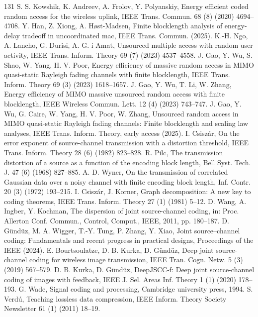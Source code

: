 \begin{thebibliography}{131}
 S. S. Kowshik, K. Andreev, A. Frolov, Y. Polyanskiy, Energy efficient coded random access for the wireless uplink, IEEE Trans. Commun. 68 (8) (2020) 4694--4708.
 Y. Han, Z. Xiong, A. Høst-Madsen, Finite blocklength analysis of energy-delay tradeoff in uncoordinated mac, IEEE Trans. Commun. (2025).
 K.-H. Ngo, A. Lancho, G. Durisi, A. G. i Amat, Unsourced multiple access with random user activity, IEEE Trans. Inform. Theory 69 (7) (2023) 4537--4558.
 J. Gao, Y. Wu, S. Shao, W. Yang, H. V. Poor, Energy efficiency of massive random access in MIMO quasi-static Rayleigh fading channels with finite blocklength, IEEE Trans. Inform. Theory 69 (3) (2023) 1618--1657.
 J. Gao, Y. Wu, T. Li, W. Zhang, Energy efficiency of MIMO massive unsourced random access with finite blocklength, IEEE Wireless Commun. Lett. 12 (4) (2023) 743--747.
 J. Gao, Y. Wu, G. Caire, W. Yang, H. V. Poor, W. Zhang, Unsourced random access in MIMO quasi-static Rayleigh fading channels: Finite blocklength and scaling law analyses, IEEE Trans. Inform. Theory, early access (2025).
 I. Csiszár, On the error exponent of source-channel transmission with a distortion threshold, IEEE Trans. Inform. Theory 28 (6) (1982) 823--828.
 R. Pilc, The transmission distortion of a source as a function of the encoding block length, Bell Syst. Tech. J. 47 (6) (1968) 827--885.
 A. D. Wyner, On the transmission of correlated Gaussian data over a noisy channel with finite encoding block length, Inf. Contr. 20 (3) (1972) 193--215.
 I. Csiszár, J. Korner, Graph decomposition: A new key to coding theorems, IEEE Trans. Inform. Theory 27 (1) (1981) 5--12.
 D. Wang, A. Ingber, Y. Kochman, The dispersion of joint source-channel coding, in: Proc. Allerton Conf. Commun., Control, Comput., IEEE, 2011, pp. 180--187.
 D. Gündüz, M. A. Wigger, T.-Y. Tung, P. Zhang, Y. Xiao, Joint source--channel coding: Fundamentals and recent progress in practical designs, Proceedings of the IEEE (2024).
 E. Bourtsoulatze, D. B. Kurka, D. Gündüz, Deep joint source-channel coding for wireless image transmission, IEEE Tran. Cogn. Netw. 5 (3) (2019) 567--579.
 D. B. Kurka, D. Gündüz, DeepJSCC-f: Deep joint source-channel coding of images with feedback, IEEE J. Sel. Areas Inf. Theory 1 (1) (2020) 178--193.
 G. Wade, Signal coding and processing, Cambridge university press, 1994.
 S. Verdú, Teaching lossless data compression, IEEE Inform. Theory Society Newsletter 61 (1) (2011) 18--19.

\end{thebibliography}
